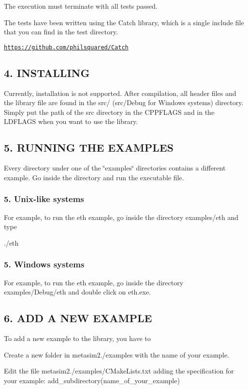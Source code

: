 The execution must terminate with all tests passed.

The tests have been written using the Catch library, which is a single include file that you can find in the test directory.

\href{https://github.com/philsquared/Catch}{\tt https\+://github.\+com/philsquared/\+Catch}

\subsection*{4. I\+N\+S\+T\+A\+L\+L\+I\+NG}

Currently, installation is not supported. After compilation, all header files and the library file are found in the src/ (src/\+Debug for Windows systems) directory. Simply put the path of the src directory in the C\+P\+P\+F\+L\+A\+GS and in the L\+D\+F\+L\+A\+GS when you want to use the library.

\subsection*{5. R\+U\+N\+N\+I\+NG T\+HE E\+X\+A\+M\+P\+L\+ES}

Every directory under one of the \char`\"{}examples\char`\"{} directories contains a different example. Go inside the directory and run the executable file.

\subsubsection*{5. Unix-\/like systems}

For example, to run the eth example, go inside the directory examples/eth and type

./eth

\subsubsection*{5. Windows systems}

For example, to run the eth example, go inside the directory examples/\+Debug/eth and double click on eth.\+exe.

\subsection*{6. A\+DD A N\+EW E\+X\+A\+M\+P\+LE}

To add a new example to the library, you have to


\begin{DoxyItemize}
\item Create a new folder in metasim2./examples with the name of your example.
\item Edit the file metasim2./examples/\+C\+Make\+Lists.txt adding the specification for your example\+: add\+\_\+subdirectory(name\+\_\+of\+\_\+your\+\_\+example)
\end{DoxyItemize}

